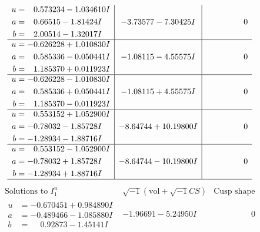 \documentclass[1p]{elsarticle_modified}
\theoremstyle{definition}
\newcommand{\I}{\sqrt{-1}}
\begin{document}
$$\begin{array}{c|c|c}
\begin{aligned}
u &= \phantom{-}0.573234 - 1.034610 I \\
a &= \phantom{-}0.66515 - 1.81424 I \\
b &= \phantom{-}2.00514 - 1.32017 I\end{aligned}
 & -3.73577 - 7.30425 I & \phantom{-0.000000 } 0 \\ \hline\begin{aligned}
u &= -0.626228 + 1.010830 I \\
a &= \phantom{-}0.585336 - 0.050441 I \\
b &= \phantom{-}1.185370 + 0.011923 I\end{aligned}
 & -1.08115 - 4.55575 I & \phantom{-0.000000 } 0 \\ \hline\begin{aligned}
u &= -0.626228 - 1.010830 I \\
a &= \phantom{-}0.585336 + 0.050441 I \\
b &= \phantom{-}1.185370 - 0.011923 I\end{aligned}
 & -1.08115 + 4.55575 I & \phantom{-0.000000 } 0 \\ \hline\begin{aligned}
u &= \phantom{-}0.553152 + 1.052900 I \\
a &= -0.78032 - 1.85728 I \\
b &= -1.28934 - 1.88716 I\end{aligned}
 & -8.64744 + 10.19800 I & \phantom{-0.000000 } 0 \\ \hline\begin{aligned}
u &= \phantom{-}0.553152 - 1.052900 I \\
a &= -0.78032 + 1.85728 I \\
b &= -1.28934 + 1.88716 I\end{aligned}
 & -8.64744 - 10.19800 I & \phantom{-0.000000 } 0\\
 \hline 
 \end{array}$$\newpage$$\begin{array}{c|c|c}  
\text{Solutions to }I^u_{1}& \I (\text{vol} + \sqrt{-1}CS) & \text{Cusp shape}\\
 \hline 
\begin{aligned}
u &= -0.670451 + 0.984890 I \\
a &= -0.489466 - 1.085880 I \\
b &= \phantom{-}0.92873 - 1.45141 I\end{aligned}
 & -1.96691 - 5.24950 I & \phantom{-0.000000 } 0 \\ \hline\begin{aligned}

\end{aligned}
\end{array}$$
\end{document}
